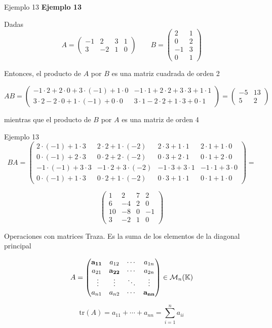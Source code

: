 \documentclass[
  ignorenonframetext,
]{beamer}
\begin{document}
\begin{frame}{Ejemplo 13}
\protect\hypertarget{ejemplo-13}{}
\textbf{Ejemplo 13}

Dadas
\[A=\begin{pmatrix}-1&2&3&1\\3&-2&1&0\end{pmatrix}\qquad B=\begin{pmatrix}2&1\\0&2\\-1&3\\0&1\end{pmatrix}\]

Entonces, el producto de \(A\) por \(B\) es una matriz cuadrada de orden
2

\[AB =  \begin{pmatrix}-1\cdot 2+2\cdot 0 + 3\cdot(-1)+1\cdot 0&-1\cdot 1+2\cdot2+3\cdot3+1\cdot 1\\3\cdot2-2\cdot0+1\cdot(-1)+0\cdot0&3\cdot1-2\cdot2+1\cdot3+0\cdot1\end{pmatrix} =\begin{pmatrix}-5&13\\5&2\end{pmatrix}\]

mientras que el producto de \(B\) por \(A\) es una matriz de orden 4
\end{frame}

\begin{frame}{Ejemplo 13}
\protect\hypertarget{ejemplo-13-1}{}
\[BA=\begin{pmatrix}2\cdot(-1)+1\cdot3&2\cdot2+1\cdot(-2)&2\cdot3+1\cdot1&2\cdot1+1\cdot0\\0\cdot(-1)+2\cdot3&0\cdot2+2\cdot(-2)&0\cdot3+2\cdot1&0\cdot1+2\cdot0\\-1\cdot(-1)+3\cdot3&-1\cdot2+3\cdot(-2)&-1\cdot3+3\cdot1&-1\cdot1+3\cdot0\\0\cdot(-1)+1\cdot3&0\cdot2+1\cdot(-2)&0\cdot3+1\cdot1&0\cdot1+1\cdot0\end{pmatrix}=\]

\[\begin{pmatrix}1&2&7&2\\6&-4&2&0\\10&-8&0&-1\\3&-2&1&0\end{pmatrix}\]
\end{frame}

\begin{frame}{Operaciones con matrices}
\protect\hypertarget{operaciones-con-matrices-6}{}
Traza. Es la suma de los elementos de la diagonal principal

\[A = \begin{pmatrix}\bf{a_{11}}&a_{12}&\cdots&a_{1n}\\a_{21}&\bf{a_{22}}&\cdots&a_{2n}\\\ \vdots & \vdots & \ddots& \vdots\\a_{n1}&a_{n2}&\cdots&\bf{a_{nn}}\end{pmatrix}\in\mathcal{M}_n(\mathbb{K})\]

\[\text{tr}(A) = a_{11}+\cdots+a_{nn} = \sum_{i = 1}^na_{ii}\]
\end{frame}
\end{document}
